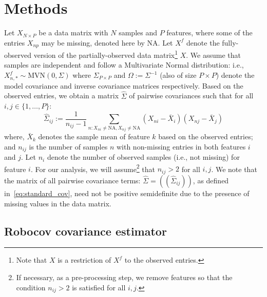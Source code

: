\section{Methods}\label{sec:methods-materials}

Let $X_{N \times P}$ be a data matrix with $N$ samples and $P$ features, where some of the entries $X_{np}$ may be missing, denoted here by $\text{NA}$. Let $X^f$ denote the fully-observed version of the partially-observed data matrix\footnote{Note that  $X$ is a restriction of $X^f$ to the observed entries.} $X$. We assume that samples are independent and follow a Multivariate Normal distribution: i.e., 
$X^f_{n,*} \sim \text{MVN} ( 0, \Sigma )$ 
where $\Sigma_{P \times P}$ and $\Omega:=\Sigma^{-1}$ (also of size $P \times P$) denote the model covariance and inverse covariance matrices respectively. 
Based on the observed entries, we obtain a matrix $\hat{\Sigma}$ of pairwise covariances such that for all $i, j \in \{1, \ldots, P\}$:
\begin{equation}\label{eq:standard_cov}
   \hat{\Sigma}_{ij} := \frac{1}{n_{ij} - 1} \sum_{n: X_{ni} \neq \text{NA}, X_{nj} \neq \text{NA}} (X_{ni} - \bar{X}_{i})(X_{nj} - \bar{X}_{j})
\end{equation}
where, $\bar{X}_{k}$ denotes the sample mean of feature $k$ based on the observed entries; and $n_{ij}$ is the number of samples $n$ with non-missing entries in both features $i$ and $j$. Let $n_i$ denote the number of observed samples (i.e., not missing) for feature $i$. For our analysis, we will assume\footnote{If necessary, as a pre-processing step, we remove features so that the condition $n_{ij}>2$ is satisfied for all $i,j$.} that $n_{ij}>2$ for all $i,j$.
We note that the matrix of all pairwise covariance terms: $\hat{\Sigma} = ((\hat{\Sigma}_{ij}))$, as defined in~\eqref{eq:standard_cov}, need not be positive semidefinite due to the presence of missing values in the data matrix.

 \subsection{Robocov covariance estimator}\label{sec:cov-estimator}

